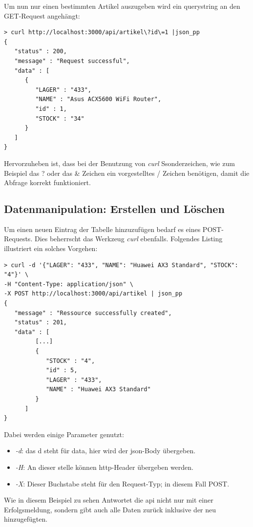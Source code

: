 Um nun nur einen bestimmten Artikel auszugeben wird ein querystring an den GET-Request angehängt:
\begin{verbatim}
> curl http://localhost:3000/api/artikel\?id\=1 |json_pp                                                                                                                                       
{
   "status" : 200,
   "message" : "Request successful",
   "data" : [
      {
         "LAGER" : "433",
         "NAME" : "Asus ACX5600 WiFi Router",
         "id" : 1,
         "STOCK" : "34"
      }
   ]
}
\end{verbatim}

Hervorzuheben ist, dass bei der Benutzung von \textit{curl} Ssonderzeichen, wie zum Beispiel das ? oder das \& Zeichen ein vorgestelltes / Zeichen benötigen, damit die Abfrage korrekt funktioniert. 

\subsection{Datenmanipulation: Erstellen und Löschen}
Um einen neuen Eintrag der Tabelle hinzuzufügen bedarf es eines POST-Requests. Dies beherrscht das Werkzeug \textit{curl} ebenfalls. Folgendes Listing illustriert ein solches Vorgehen:

\begin{verbatim}
> curl -d '{"LAGER": "433", "NAME": "Huawei AX3 Standard", "STOCK": "4"}' \
-H "Content-Type: application/json" \
-X POST http://localhost:3000/api/artikel | json_pp 
{
   "message" : "Ressource successfully created",
   "status" : 201,
   "data" : [
         [...]
         {
            "STOCK" : "4",
            "id" : 5,
            "LAGER" : "433",
            "NAME" : "Huawei AX3 Standard"
         }
      ]
}
\end{verbatim}

Dabei werden einige Parameter genutzt:
\begin{itemize}
    \item \textit{-d}: das d steht für data, hier wird der \gls{json}-Body übergeben. 
    \item \textit{-H}: An dieser stelle können \gls{http}-Header übergeben werden.
    \item \textit{-X}: Dieser Buchstabe steht für den Request-Typ; in diesem Fall POST.
\end{itemize}

Wie in diesem Beispiel zu sehen Antwortet die \gls{api} nicht nur mit einer Erfolgsmeldung, sondern gibt auch alle Daten zurück inklusive der neu hinzugefügten.

